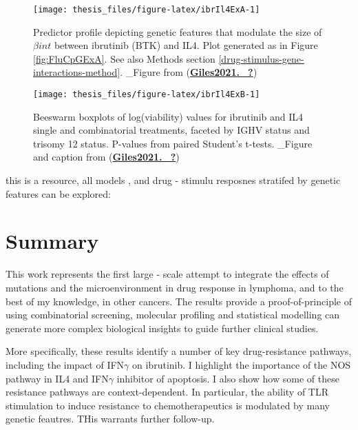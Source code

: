 \documentclass[11pt, a4paper, twosided]{book}
\begin{document}
\begin{figure}

{\centering \texttt{[image: thesis\_files/figure-latex/ibrIl4ExA-1]} 

}

\caption{Predictor profile depicting genetic features that modulate the size of \(\beta{int}\) between ibrutinib (BTK) and IL4. Plot generated as in Figure \ref{fig:FluCpGExA}. See also Methods section \ref{drug-stimulus-gene-interactions-method}. \_Figure from (\protect\hyperlink{ref-Giles2021._}{\textbf{Giles2021.\_?}})}\label{fig:ibrIl4ExA}
\end{figure}
\begin{figure}

{\centering \texttt{[image: thesis\_files/figure-latex/ibrIl4ExB-1]} 

}

\caption{Beeswarm boxplots of log(viability) values for ibrutinib and IL4 single and combinatorial treatments, faceted by IGHV status and trisomy 12 status. P-values from paired Student's t-tests. \_Figure and caption from (\protect\hyperlink{ref-Giles2021._}{\textbf{Giles2021.\_?}})}\label{fig:ibrIl4ExB}
\end{figure}
this is a resource, all models , and drug - stimulu resposnes stratifed by genetic features can be explored:

\hypertarget{summary-2}{%
\section{Summary}\label{summary-2}}

This work represents the first large - scale attempt to integrate the effects of mutations and the microenvironment in drug response in lymphoma, and to the best of my knowledge, in other cancers. The results provide a proof-of-principle of using combinatorial screening, molecular profiling and statistical modelling can generate more complex biological insights to guide further clinical studies.

More specifically, these results identify a number of key drug-resistance pathways, including the impact of IFN\(\gamma\) on ibrutinib. I highlight the importance of the NOS pathway in IL4 and IFN\(\gamma\) inhibitor of apoptosis. I also show how some of these resistance pathways are context-dependent. In particular, the ability of TLR stimulation to induce resistance to chemotherapeutics is modulated by many genetic feautres. THis warrants further follow-up.
\end{document}
